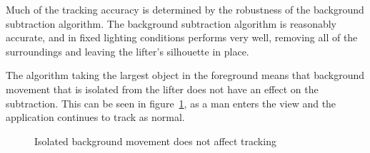 Much of the tracking accuracy is determined by the robustness of the background subtraction algorithm. The background subtraction algorithm is reasonably accurate, and in fixed lighting conditions performs very well, removing all of the surroundings and leaving the lifter's silhouette in place.

The algorithm taking the largest object in the foreground means that background movement that is isolated from the lifter does not have an effect on the subtraction. This can be seen in figure~\ref{fig:goodbackground}, as a man enters the view and the application continues to track as normal.

\begin{figure}[H]
    \centering
\caption{Isolated background movement does not affect tracking}
\label{fig:goodbackground}
\end{figure}

